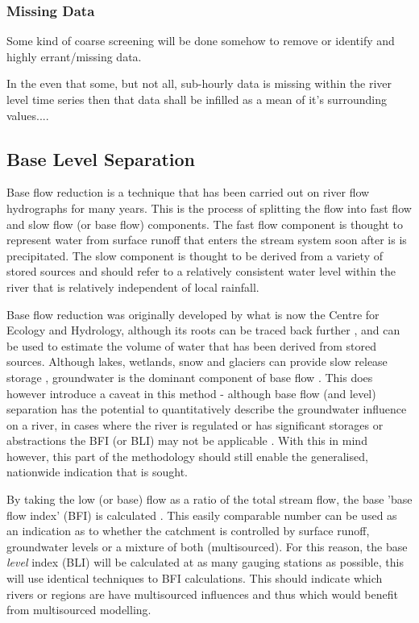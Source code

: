 \documentclass[DIV=calc, paper=a4, fontsize=11pt, twocolumn]{scrartcl}	 %
\begin{document}
\subsubsection*{Missing Data}
Some kind of coarse screening will be done somehow to remove or identify and highly errant/missing data. 

In the even that some, but not all, sub-hourly data is missing within the river level time series then that data shall be infilled as a mean of it's surrounding values....

	\subsection{Base Level Separation}
Base flow reduction is a technique that has been carried out on river flow hydrographs for many years. This is the process of splitting the flow into fast flow and slow flow (or base flow) components. The fast flow component is thought to represent water from surface runoff that enters the stream system soon after is is precipitated. The slow component is thought to be derived from a variety of stored sources \citep{Tallaksen1995} and should refer to a relatively consistent water level within the river that is relatively independent of local rainfall. 

Base flow reduction was originally developed by what is now the Centre for Ecology and Hydrology, although its roots can be traced back further \citep{Brodie2005}, and can be used to estimate the volume of water that has been derived from stored sources. Although lakes, wetlands, snow and glaciers can provide slow release storage \citep{Brodie2005}, groundwater is the dominant component of base flow \citep{Li2013,Stewart2007}. This does however introduce a caveat in this method - although base flow (and level) separation has the potential to quantitatively describe the groundwater influence on a river, in cases where the river is regulated or has significant storages or abstractions the BFI (or BLI) may not be applicable \citep{Brodie2005}. With this in mind however, this part of the methodology should still enable the generalised, nationwide indication that is sought.

By taking the low (or base) flow as a ratio of the total stream flow, the base 'base flow index' (BFI) is calculated \citep{Gustard1992}. This easily comparable number can be used as an indication as to whether the catchment is controlled by surface runoff, groundwater levels or a mixture of both (multisourced). For this reason, the base \textit{level} index (BLI) will be calculated at as many gauging stations as possible, this will use identical techniques to BFI calculations. This should indicate which rivers or regions are have multisourced  influences and thus which would benefit from multisourced modelling.
\end{document}
